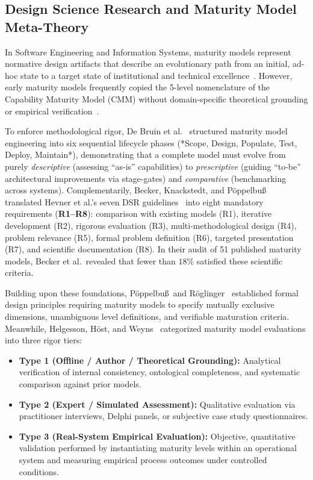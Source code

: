 \subsection{Design Science Research and Maturity Model Meta-Theory}
\label{subsec:dsr_foundations}

In Software Engineering and Information Systems, maturity models represent normative design artifacts that describe an evolutionary path from an initial, ad-hoc state to a target state of institutional and technical excellence~\cite{debruin_2005, mettler_2011, adekunle_2022}. However, early maturity models frequently copied the 5-level nomenclature of the Capability Maturity Model (CMM) without domain-specific theoretical grounding or empirical verification~\cite{lasrado_2015, proenca_2016}.

To enforce methodological rigor, De Bruin et al.~\cite{debruin_2005} structured maturity model engineering into six sequential lifecycle phases (*Scope, Design, Populate, Test, Deploy, Maintain*), demonstrating that a complete model must evolve from purely \textit{descriptive} (assessing ``as-is'' capabilities) to \textit{prescriptive} (guiding ``to-be'' architectural improvements via stage-gates) and \textit{comparative} (benchmarking across systems). Complementarily, Becker, Knackstedt, and P\"{o}ppelbu\ss~\cite{becker_2009} translated Hevner et al.'s seven DSR guidelines~\cite{hevner_2004} into eight mandatory requirements (\textbf{R1--R8}): comparison with existing models (R1), iterative development (R2), rigorous evaluation (R3), multi-methodological design (R4), problem relevance (R5), formal problem definition (R6), targeted presentation (R7), and scientific documentation (R8). In their audit of 51 published maturity models, Becker et al.\ revealed that fewer than $18\%$ satisfied these scientific criteria.

Building upon these foundations, P\"{o}ppelbu\ss\ and R\"{o}glinger~\cite{poppelbuss_2011, roglinger_2012} established formal design principles requiring maturity models to specify mutually exclusive dimensions, unambiguous level definitions, and verifiable maturation criteria. Meanwhile, Helgesson, H\"{o}st, and Weyns~\cite{helgesson_2012} categorized maturity model evaluations into three rigor tiers:
\begin{itemize}[leftmargin=*, nosep]
    \item \textbf{Type 1 (Offline / Author / Theoretical Grounding):} Analytical verification of internal consistency, ontological completeness, and systematic comparison against prior models.
    \item \textbf{Type 2 (Expert / Simulated Assessment):} Qualitative evaluation via practitioner interviews, Delphi panels, or subjective case study questionnaires.
    \item \textbf{Type 3 (Real-System Empirical Evaluation):} Objective, quantitative validation performed by instantiating maturity levels within an operational system and measuring empirical process outcomes under controlled conditions.
\end{itemize}

